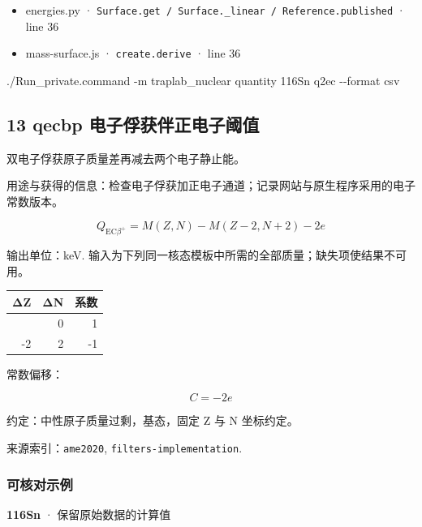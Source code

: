 \documentclass[
  11pt,
  letterpaper,
]{article}
\newenvironment{Shaded}{}{}
\newcommand{\AttributeTok}[1]{\textcolor[rgb]{0.49,0.56,0.16}{#1}}
\newcommand{\ExtensionTok}[1]{#1}
\newcommand{\NormalTok}[1]{#1}
\providecommand{\tightlist}{%
  \setlength{\itemsep}{0pt}\setlength{\parskip}{0pt}}
\begin{document}
\begin{itemize}
\tightlist
\item
  energies.py ·
  \texttt{Surface.get\ /\ Surface.\_linear\ /\ Reference.published} ·
  line 36
\item
  mass-surface.js · \texttt{create.derive} · line 36
\end{itemize}

\begin{Shaded}
\begin{Highlighting}[]
\ExtensionTok{./Run\_private.command} \AttributeTok{{-}m}\NormalTok{ traplab\_nuclear quantity 116Sn q2ec }\AttributeTok{{-}{-}format}\NormalTok{ csv}
\end{Highlighting}
\end{Shaded}

\subsection{13 qecbp
电子俘获伴正电子阈值}\label{qecbp-ux7535ux5b50ux4fd8ux83b7ux4f34ux6b63ux7535ux5b50ux9608ux503c}

双电子俘获原子质量差再减去两个电子静止能。

用途与获得的信息：检查电子俘获加正电子通道；记录网站与原生程序采用的电子常数版本。

\[
Q_{{\mathrm{EC}}\beta^+}=M(Z,N)-M(Z-2,N+2)-2e
\]

输出单位：keV.
输入为下列同一核态模板中所需的全部质量；缺失项使结果不可用。

\begin{longtable}[]{@{}rrr@{}}
\toprule\noalign{}
ΔZ & ΔN & 系数 \\
\midrule\noalign{}
\endhead
\bottomrule\noalign{}
\endlastfoot
0 & 0 & 1 \\
-2 & 2 & -1 \\
\end{longtable}

常数偏移：

\[
C=-2e
\]

约定：中性原子质量过剩，基态，固定 Z 与 N 坐标约定。

来源索引：\texttt{ame2020}, \texttt{filters-implementation}.

\subsubsection{可核对示例}\label{ux53efux6838ux5bf9ux793aux4f8b-12}

\textbf{116Sn} · 保留原始数据的计算值
\end{document}
